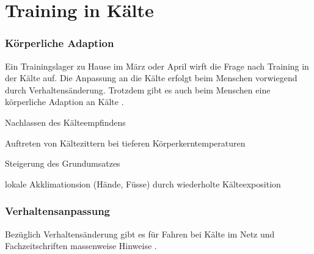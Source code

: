 \documentclass[a4paper,DIV13,BCOR0cm]{scrartcl}
\newcommand{\Tlzh}{Trainingslager zu Hause}
\begin{document}
\section{Training in Kälte}

\subsubsection{Körperliche Adaption}
Ein \Tlzh{} im März oder April wirft die Frage nach Training in der Kälte auf.
Die Anpassung an die Kälte erfolgt beim Menschen vorwiegend durch Verhaltensänderung.
Trotzdem gibt es auch beim Menschen eine körperliche Adaption an Kälte \cite[S. 1032]{Weineck2010}.

\begin{itemize*}
        \item Nachlassen des Kälteempfindens
        \item Auftreten von Kältezittern bei tieferen Körperkerntemperaturen
        \item Steigerung des Grundumsatzes
        \item lokale Akklimationsion (Hände, Füsse) durch wiederholte Kälteexposition
\end{itemize*}

\subsubsection{Verhaltensanpassung}

Bezüglich Verhaltensänderung gibt es für Fahren bei Kälte im Netz und Fachzeitschriften massenweise Hinweise
\cite{Thomas2009rennradbuch, gcn2011winter,gcn2015winter, gcn2015wintermistakes,beck2015frostschutz}.
\end{document}
